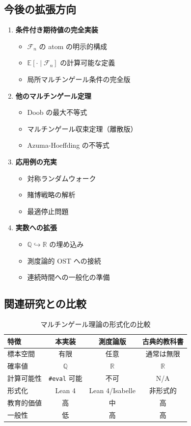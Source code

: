 \documentclass[a4paper,12pt]{ltjsarticle}
\theoremstyle{definition}
\begin{document}
\subsection{今後の拡張方向}

\begin{enumerate}
\item \textbf{条件付き期待値の完全実装}
  \begin{itemize}
    \item $\mathcal{F}_n$ の atom の明示的構成
    \item $\mathbb{E}[\cdot \mid \mathcal{F}_n]$ の計算可能な定義
    \item 局所マルチンゲール条件の完全版
  \end{itemize}

\item \textbf{他のマルチンゲール定理}
  \begin{itemize}
    \item Doob の最大不等式
    \item マルチンゲール収束定理（離散版）
    \item Azuma-Hoeffding の不等式
  \end{itemize}

\item \textbf{応用例の充実}
  \begin{itemize}
    \item 対称ランダムウォーク
    \item 賭博戦略の解析
    \item 最適停止問題
  \end{itemize}

\item \textbf{実数への拡張}
  \begin{itemize}
    \item $\mathbb{Q} \hookrightarrow \mathbb{R}$ の埋め込み
    \item 測度論的 OST への接続
    \item 連続時間への一般化の準備
  \end{itemize}
\end{enumerate}

\subsection{関連研究との比較}

\begin{table}[h]
\centering
\caption{マルチンゲール理論の形式化の比較}
\begin{tabular}{lccc}
\hline
特徴 & 本実装 & 測度論版 & 古典的教科書 \\
\hline
標本空間 & 有限 & 任意 & 通常は無限 \\
確率値 & $\mathbb{Q}$ & $\mathbb{R}$ & $\mathbb{R}$ \\
計算可能性 & \texttt{\#eval} 可能 & 不可 & N/A \\
形式化 & Lean 4 & Lean 4/Isabelle & 非形式的 \\
教育的価値 & 高 & 中 & 高 \\
一般性 & 低 & 高 & 高 \\
\hline
\end{tabular}
\end{table}
\end{document}
